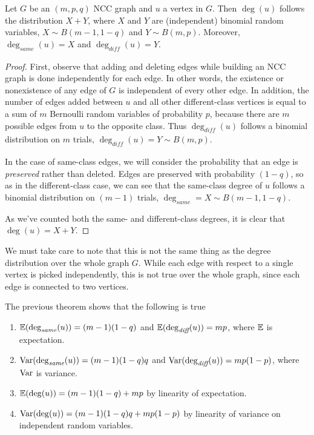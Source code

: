 \begin{theorem}
  \label{thm:ncc_deg}
  Let $G$ be an $(m,p,q)$ NCC graph and $u$ a vertex in $G$. Then $\deg(u)$ follows the distribution
  $X + Y$, where $X$ and $Y$ are (independent) binomial random variables, $X \sim B(m-1,1-q)$ and
  $Y \sim B(m,p)$. Moreover, $\deg_{\textit{same}}(u) = X$ and $\deg_{\textit{diff}}(u) = Y$.
\end{theorem}
\begin{proof}
  First, observe that adding and deleting edges while building an NCC graph is done independently
  for each edge. In other words, the existence or nonexistence of any edge of $G$ is independent of
  every other edge. In addition, the number of edges added between $u$ and all other different-class
  vertices is equal to a sum of $m$ Bernoulli random variables of probability $p$, because there are
  $m$ possible edges from $u$ to the opposite class. Thus $\deg_{\textit{diff}}(u)$ follows a
  binomial distribution on $m$ trials, $\deg_{\textit{diff}}(u) = Y \sim B(m,p)$.

  In the case of same-class edges, we will consider the probability that an edge is \textit{preserved}
  rather than deleted. Edges are preserved with probability $(1-q)$, so as in the different-class
  case, we can see that the same-class degree of $u$ follows a binomial distribution on $(m-1)$
  trials, $\deg_{\textit{same}} = X \sim B(m-1,1-q)$.

  As we've counted both the same- and different-class degrees, it is clear that $\deg(u) = X + Y$.
\end{proof}

We must take care to note that this is not the same thing as the degree distribution over the whole
graph $G$. While each edge with respect to a single vertex is picked independently, this is not true
over the whole graph, since each edge is connected to two vertices.

\begin{remark}
  The previous theorem shows that the following is true
  \begin{enumerate}
  \item $\mathbb{E}(\deg_{\textit{same}}(u)) = (m-1)(1-q)$ and $\mathbb{E}(\deg_{\textit{diff}}(u)) = mp$, where $\mathbb{E}$ is expectation.
  \item $\mathrm{Var}(\deg_{\textit{same}}(u)) = (m-1)(1-q)q$ and $\mathrm{Var}(\deg_{\textit{diff}}(u)) = mp(1-p)$, where $\mathrm{Var}$ is
    variance.
  \item $\mathbb{E}(\deg(u)) = (m-1)(1-q) + mp$ by linearity of expectation.
  \item $\mathrm{Var}(\deg(u)) = (m-1)(1-q)q + mp(1-p)$ by linearity of variance on independent random
    variables.
  \end{enumerate}
\end{remark}

